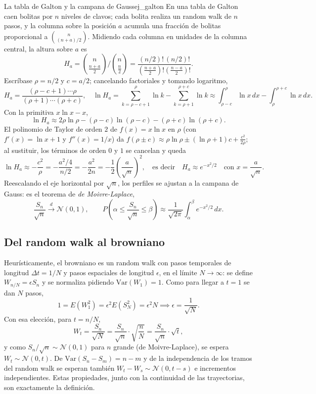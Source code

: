 \documentclass[11pt, a4paper]{article}
\begin{document}
\begin{ejemplo}{La tabla de Galton y la campana de Gauss}{ej_galton}
En una tabla de Galton caen bolitas por $n$ niveles de clavos; cada bolita realiza un random
walk de $n$ pasos, y la columna sobre la posición $a$ acumula una fracción de bolitas
proporcional a $\binom{n}{(n+a)/2}$. Midiendo cada columna en unidades de la columna central,
la altura sobre $a$ es
$$ H_a = \binom{n}{\frac{n+a}{2}} \Big/ \binom{n}{\frac{n}{2}} =
\frac{(n/2)! \, (n/2)!}{\left(\frac{n+a}{2}\right)! \left(\frac{n-a}{2}\right)!}. $$
Escríbase $\rho = n/2$ y $c = a/2$; cancelando factoriales y tomando logaritmo,
$$ H_a = \frac{(\rho - c + 1) \cdots \rho}{(\rho + 1) \cdots (\rho + c)}, \quad
\ln H_a = \sum_{k = \rho - c + 1}^{\rho} \ln k - \sum_{k = \rho + 1}^{\rho + c} \ln k
\approx \int_{\rho - c}^{\rho} \ln x \, dx - \int_{\rho}^{\rho + c} \ln x \, dx. $$
Con la primitiva $x \ln x - x$,
$$ \ln H_a \approx 2 \rho \ln \rho - (\rho - c) \ln(\rho - c) - (\rho + c) \ln(\rho + c). $$
El polinomio de Taylor de orden $2$ de $f(x) = x \ln x$ en $\rho$ (con $f'(x) = \ln x + 1$ y
$f''(x) = 1/x$) da $f(\rho \pm c) \approx \rho \ln \rho \pm (\ln \rho + 1) c +
\frac{c^2}{2\rho}$; al sustituir, los términos de orden $0$ y $1$ se cancelan y queda
$$ \ln H_a \approx -\frac{c^2}{\rho} = -\frac{a^2/4}{n/2} = -\frac{a^2}{2n}
= -\frac{1}{2} \left( \frac{a}{\sqrt{n}} \right)^{\!2}, \quad \text{es decir} \quad
H_a \approx e^{-x^2/2} \quad \text{con } x = \frac{a}{\sqrt{n}}. $$
Reescalando el eje horizontal por $\sqrt{n}$, los perfiles se ajustan a la campana de Gauss:
es el teorema de \emph{de Moivre-Laplace},
$$ \frac{S_n}{\sqrt{n}} \xrightarrow{d} \mathcal{N}(0, 1), \qquad
P\!\left( \alpha \le \frac{S_n}{\sqrt{n}} \le \beta \right) \approx \frac{1}{\sqrt{2 \pi}}
\int_\alpha^\beta e^{-x^2/2} \, dx. $$
\end{ejemplo}

\subsection{Del random walk al browniano}

Heurísticamente, el browniano es un random walk con pasos temporales de longitud
$\Delta t = 1/N$ y pasos espaciales de longitud $\epsilon$, en el límite $N \to \infty$: se
define $W_{n/N} = \epsilon S_n$ y se normaliza pidiendo $\mathrm{Var}(W_1) = 1$. Como para
llegar a $t = 1$ se dan $N$ pasos,
$$ 1 = E(W_1^2) = \epsilon^2 E(S_N^2) = \epsilon^2 N \implies \epsilon = \frac{1}{\sqrt{N}}. $$
Con esa elección, para $t = n/N$,
$$ W_t = \frac{S_n}{\sqrt{N}} = \frac{S_n}{\sqrt{n}} \cdot \sqrt{\frac{n}{N}} =
\frac{S_n}{\sqrt{n}} \cdot \sqrt{t}, $$
y como $S_n / \sqrt{n} \sim \mathcal{N}(0, 1)$ para $n$ grande (de Moivre-Laplace), se espera
$W_t \sim \mathcal{N}(0, t)$. De $\mathrm{Var}(S_n - S_m) = n - m$ y de la independencia de los
tramos del random walk se esperan también $W_t - W_s \sim \mathcal{N}(0, t - s)$ e incrementos
independientes. Estas propiedades, junto con la continuidad de las trayectorias, son
exactamente la definición.
\end{document}
